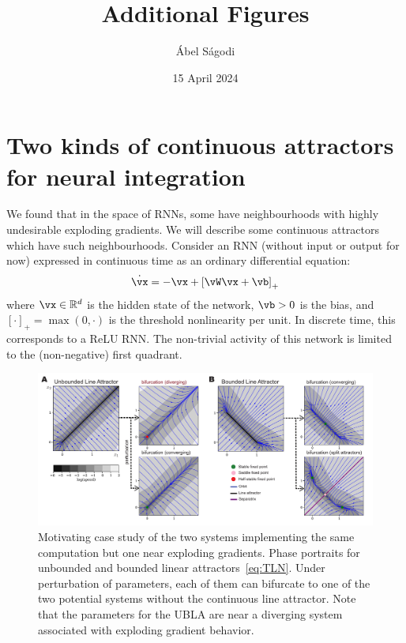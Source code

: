 \documentclass{article}
\title{Additional Figures}
\author{\'Abel S\'agodi}
\date{15 April 2024}
\newcommand{\reals}{\mathbb{R}}
\newcounter{ct}
\theoremstyle{definition}
\theoremstyle{remark}
\begin{document}

\maketitle


\newpage
\section{Two kinds of continuous attractors for neural integration}
We found that in the space of RNNs, some have neighbourhoods with highly undesirable exploding gradients. We will describe some continuous attractors which have such neighbourhoods.
Consider an RNN (without input or output for now) expressed in continuous time as an ordinary differential equation:
\begin{align}\label{eq:TLN}
    \dot{\vx} = -\vx + \left[ \vW \vx + \vb \right]_{+}
\end{align}
where $\vx \in \reals^d$ is the hidden state of the network, $\vb > 0$ is the bias, and $[\cdot]_{+} = \max(0,\cdot)$ is the threshold nonlinearity per unit.
In discrete time, this corresponds to a ReLU RNN.
The non-trivial activity of this network is limited to the (non-negative) first quadrant.
\begin{figure}[tbhp]
  \centering
  \includegraphics[width=\textwidth]{UBLABLA}
  \caption{Motivating case study of the two systems implementing the same computation but one near exploding gradients.
    Phase portraits for unbounded and bounded linear attractors~\eqref{eq:TLN}.
    Under perturbation of parameters, each of them can bifurcate to one of the two potential systems without the continuous line attractor.
    Note that the parameters for the UBLA are near a diverging system associated with exploding gradient behavior.
}
  \label{fig:ublabla}
\end{figure}
\end{document}
